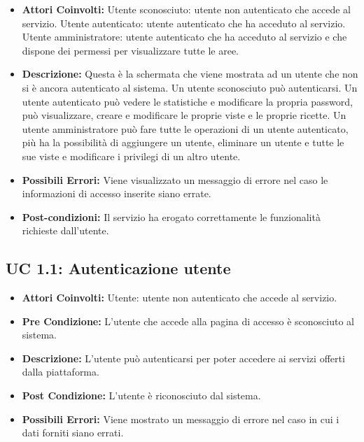 \begin{itemize}

\item \textbf{Attori Coinvolti:}
Utente sconosciuto: utente non autenticato che accede al servizio.
Utente autenticato: utente autenticato che ha acceduto al servizio.
Utente amministratore: utente autenticato che ha acceduto al servizio e che dispone dei permessi per visualizzare tutte le aree.

\item \textbf{Descrizione:}
Questa è la schermata che viene mostrata ad un utente che non si è ancora autenticato al sistema.
Un utente sconosciuto può autenticarsi. 
Un utente autenticato può vedere le statistiche e modificare la propria password, può visualizzare, creare e modificare le proprie viste e le proprie ricette. 
Un utente amministratore può fare tutte le operazioni di un utente autenticato, più ha la possibilità di aggiungere un utente, eliminare un utente e tutte le sue viste e modificare i privilegi di un altro utente.

\item \textbf{Possibili Errori:}
Viene visualizzato un messaggio di errore nel caso le informazioni di accesso inserite siano errate.

\item \textbf{Post-condizioni:}
Il servizio ha erogato correttamente le funzionalità richieste dall'utente.

\end{itemize}

\subsection{UC 1.1: Autenticazione utente}

\begin{itemize}

\item \textbf{Attori Coinvolti:}
Utente: utente non autenticato che accede al servizio.

\item \textbf{Pre Condizione:}
L'utente che accede alla pagina di accesso è sconosciuto al sistema.

\item \textbf{Descrizione:}
L'utente può autenticarsi per poter accedere ai servizi offerti dalla piattaforma.

\item \textbf{Post Condizione:}
L'utente è riconosciuto dal sistema.

\item \textbf{Possibili Errori:}
Viene mostrato un messaggio di errore nel caso in cui i dati forniti siano errati.

\end{itemize}

